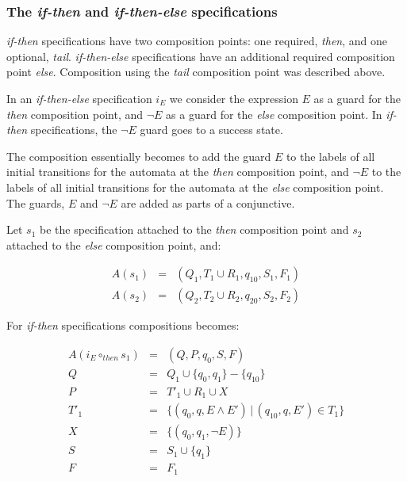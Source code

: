 \subsubsection{The \textit{if-then} and \textit{if-then-else} specifications}

\textit{if-then} specifications have two composition points: one required,
\textit{then}, and one optional, \textit{tail}. \textit{if-then-else}
specifications have an additional required composition point \textit{else}.
Composition using the \textit{tail} composition point was described above.

In an \textit{if-then-else} specification $i_E$ we consider the expression $E$
as a guard for the \textit{then} composition point, and $\neg E$ as a guard
for the \textit{else} composition point. In \textit{if-then} specifications,
the $\neg E$ guard goes to a success state.

The composition essentially becomes to add the guard $E$ to the labels of all
initial transitions for the automata at the \textit{then} composition point,
and $\neg E$ to the labels of all initial transitions for the automata at the
\textit{else} composition point. The guards, $E$ and $\neg E$ are added as
parts of a conjunctive.

Let $s_1$ be the specification attached to the \textit{then} composition point
and $s_2$ attached to the \textit{else} composition point, and:

\medskip
\[
  \begin{array}{rcl}
    A(s_1) & = & (Q_1, T_1 \cup R_1, q_{10}, S_1, F_1) \\
    A(s_2) & = & (Q_2, T_2 \cup R_2, q_{20}, S_2, F_2)
  \end{array}
\]
\medskip

For \textit{if-then} specifications compositions becomes:

\medskip
\[
  \begin{array}{rcl}
  A(i_E \circ_{then} s_1) & = & (Q, P, q_0, S, F) \\
                        Q & = & Q_1 \cup \{q_0, q_1\} - \{q_{10}\} \\
                        P & = & T'_1 \cup R_1 \cup X \\
                     T'_1 & = & \{(q_0, q, E       \wedge E') \, | \, (q_{10}, q, E') \in T_1\} \\
                        X & = & \{(q_0, q_1, \neg E)\} \\
                        S & = & S_1 \cup \{q_1\} \\
                        F & = & F_1
  \end{array}
\]
\medskip

